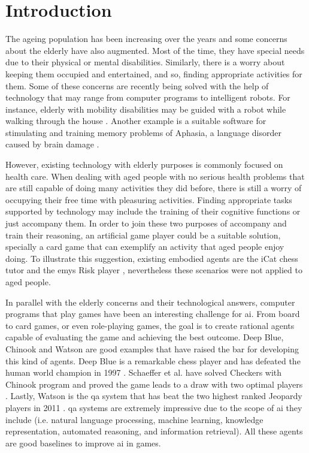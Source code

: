 \section{Introduction} \label{introduction}

The ageing population has been increasing over the years and some concerns about the elderly have also augmented.
Most of the time, they have special needs due to their physical or mental disabilities.
Similarly, there is a worry about keeping them occupied and entertained, and so, finding appropriate activities for them.
Some of these concerns are recently being solved with the help of technology that may range from computer programs to intelligent robots.
For instance, elderly with mobility disabilities may be guided with a robot while walking through the house \cite{Pollack2002}.
Another example is a suitable software for stimulating and training memory problems of Aphasia, a language disorder caused by brain damage \cite{Pompili2011}.

However, existing technology with elderly purposes is commonly focused on health care.
When dealing with aged people with no serious health problems that are still capable of doing many activities they did before, there is still a worry of occupying their free time with pleasuring activities.
Finding appropriate tasks supported by technology may include the training of their cognitive functions or just accompany them.
In order to join these two purposes of accompany and train their reasoning, an artificial game player could be a suitable solution, specially a card game that can exemplify an activity that aged people enjoy doing.
To illustrate this suggestion, existing embodied agents are the iCat chess tutor \cite{Affective2007} and the \gls{emys} Risk player \cite{Pereira}, nevertheless these scenarios were not applied to aged people.


In parallel with the elderly concerns and their technological answers, computer programs that play games have been an interesting challenge for \gls{ai}.
From board to card games, or even role-playing games, the goal is to create rational agents capable of evaluating the game and achieving the best outcome.
Deep Blue, Chinook and Watson are good examples that have raised the bar for developing this kind of agents.
Deep Blue is a remarkable chess player and has defeated the human world champion in 1997 \cite{Campbell2002}.
Schaeffer et al. have solved Checkers with Chinook program and proved the game leads to a draw with two optimal players \cite{Schaeffer1996}.
Lastly, Watson is the \gls{qa} system that has beat the two highest ranked Jeopardy players in 2011 \cite{Ferrucci2010}.
\gls{qa} systems are extremely impressive due to the scope of \gls{ai} they include (i.e. natural language processing, machine learning, knowledge representation, automated reasoning, and information retrieval).
All these agents are good baselines to improve \gls{ai} in games.


